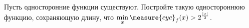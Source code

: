 Пусть односторонние функции существуют. Постройте такую одностороннюю функцию, сохраняющую длину, что
$\min\limits_{x} \measure{cyc}_{f}(x) > 2^{\frac{|x|}{2}}$.